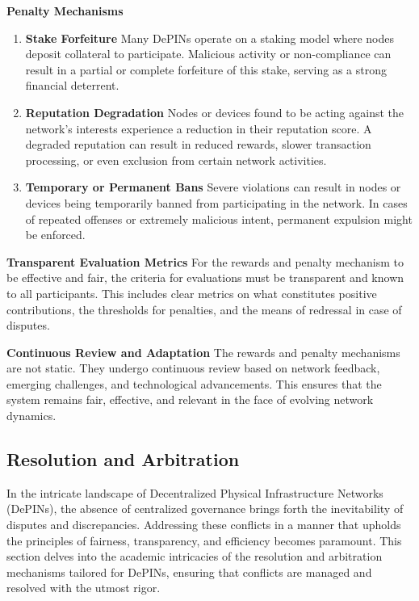 \documentclass{article}
\begin{document}
\textbf{Penalty Mechanisms}
\begin{enumerate}

\item \textbf{Stake Forfeiture}
Many DePINs operate on a staking model where nodes deposit collateral to participate. Malicious activity or non-compliance can result in a partial or complete forfeiture of this stake, serving as a strong financial deterrent.

\item \textbf{Reputation Degradation}
Nodes or devices found to be acting against the network's interests experience a reduction in their reputation score. A degraded reputation can result in reduced rewards, slower transaction processing, or even exclusion from certain network activities.

\item \textbf{Temporary or Permanent Bans}
Severe violations can result in nodes or devices being temporarily banned from participating in the network. In cases of repeated offenses or extremely malicious intent, permanent expulsion might be enforced.
\end{enumerate}

\textbf{Transparent Evaluation Metrics}
For the rewards and penalty mechanism to be effective and fair, the criteria for evaluations must be transparent and known to all participants. This includes clear metrics on what constitutes positive contributions, the thresholds for penalties, and the means of redressal in case of disputes.

\textbf{Continuous Review and Adaptation}
The rewards and penalty mechanisms are not static. They undergo continuous review based on network feedback, emerging challenges, and technological advancements. This ensures that the system remains fair, effective, and relevant in the face of evolving network dynamics.

\subsection{Resolution and Arbitration}

In the intricate landscape of Decentralized Physical Infrastructure Networks (DePINs), the absence of centralized governance brings forth the inevitability of disputes and discrepancies. Addressing these conflicts in a manner that upholds the principles of fairness, transparency, and efficiency becomes paramount. This section delves into the academic intricacies of the resolution and arbitration mechanisms tailored for DePINs, ensuring that conflicts are managed and resolved with the utmost rigor.
\end{document}
